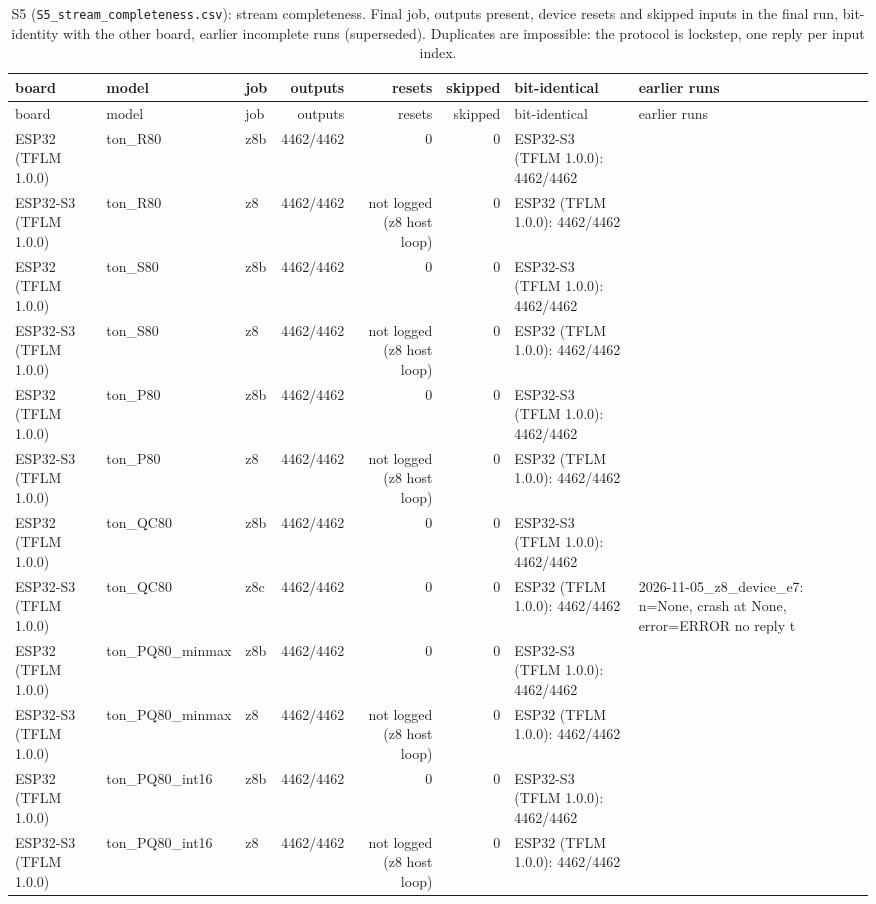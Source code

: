 \documentclass[10pt]{article}
\begin{document}
{\tiny
\begin{longtable}{lllrrrll}
\caption{S5 (\texttt{S5\_stream\_completeness.csv}): stream completeness. Final job, outputs present, device resets and skipped inputs in the final run, bit-identity with the other board, earlier incomplete runs (superseded). Duplicates are impossible: the protocol is lockstep, one reply per input index.}\\
\toprule
board & model & job & outputs & resets & skipped & bit-identical & earlier runs \\
\midrule
\endfirsthead
\toprule
board & model & job & outputs & resets & skipped & bit-identical & earlier runs \\
\midrule
\endhead
\bottomrule
\endlastfoot
ESP32 (TFLM 1.0.0) & ton\_R80 & z8b & 4462/4462 & 0 & 0 & ESP32-S3 (TFLM 1.0.0): 4462/4462 &  \\
ESP32-S3 (TFLM 1.0.0) & ton\_R80 & z8 & 4462/4462 & not logged (z8 host loop) & 0 & ESP32 (TFLM 1.0.0): 4462/4462 &  \\
ESP32 (TFLM 1.0.0) & ton\_S80 & z8b & 4462/4462 & 0 & 0 & ESP32-S3 (TFLM 1.0.0): 4462/4462 &  \\
ESP32-S3 (TFLM 1.0.0) & ton\_S80 & z8 & 4462/4462 & not logged (z8 host loop) & 0 & ESP32 (TFLM 1.0.0): 4462/4462 &  \\
ESP32 (TFLM 1.0.0) & ton\_P80 & z8b & 4462/4462 & 0 & 0 & ESP32-S3 (TFLM 1.0.0): 4462/4462 &  \\
ESP32-S3 (TFLM 1.0.0) & ton\_P80 & z8 & 4462/4462 & not logged (z8 host loop) & 0 & ESP32 (TFLM 1.0.0): 4462/4462 &  \\
ESP32 (TFLM 1.0.0) & ton\_QC80 & z8b & 4462/4462 & 0 & 0 & ESP32-S3 (TFLM 1.0.0): 4462/4462 &  \\
ESP32-S3 (TFLM 1.0.0) & ton\_QC80 & z8c & 4462/4462 & 0 & 0 & ESP32 (TFLM 1.0.0): 4462/4462 & 2026-11-05\_z8\_device\_e7: n=None, crash at None, error=ERROR no reply t \\
ESP32 (TFLM 1.0.0) & ton\_PQ80\_minmax & z8b & 4462/4462 & 0 & 0 & ESP32-S3 (TFLM 1.0.0): 4462/4462 &  \\
ESP32-S3 (TFLM 1.0.0) & ton\_PQ80\_minmax & z8 & 4462/4462 & not logged (z8 host loop) & 0 & ESP32 (TFLM 1.0.0): 4462/4462 &  \\
ESP32 (TFLM 1.0.0) & ton\_PQ80\_int16 & z8b & 4462/4462 & 0 & 0 & ESP32-S3 (TFLM 1.0.0): 4462/4462 &  \\
ESP32-S3 (TFLM 1.0.0) & ton\_PQ80\_int16 & z8 & 4462/4462 & not logged (z8 host loop) & 0 & ESP32 (TFLM 1.0.0): 4462/4462 &  \\

\end{longtable}}
\end{document}
